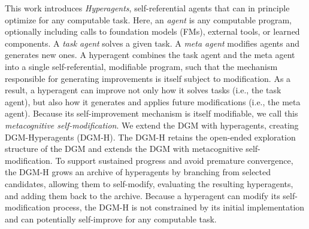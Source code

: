 \documentclass[]{fairmeta}
\begin{document}
This work introduces \textit{Hyperagents}, self-referential agents that can in principle optimize for any computable task. Here, an \textit{agent} is any computable program, optionally including calls to foundation models (FMs), external tools, or learned components. A \textit{task agent} solves a given task. A \textit{meta agent} modifies agents and generates new ones. A hyperagent combines the task agent and the meta agent into a single self-referential, modifiable program, such that the mechanism responsible for generating improvements is itself subject to modification. As a result, a hyperagent can improve not only how it solves tasks (i.e., the task agent), but also how it generates and applies future modifications (i.e., the meta agent). Because its self-improvement mechanism is itself modifiable, we call this \textit{metacognitive self-modification}.
We extend the DGM with hyperagents, creating DGM-Hyperagents (DGM-H). The DGM-H retains the open-ended exploration structure of the DGM and extends the DGM with metacognitive self-modification. To support sustained progress and avoid premature convergence, the DGM-H grows an archive of hyperagents by branching from selected candidates, allowing them to self-modify, evaluating the resulting hyperagents, and adding them back to the archive. Because a hyperagent can modify its self-modification process, the DGM-H is not constrained by its initial implementation and can potentially self-improve for any computable task.
\end{document}
